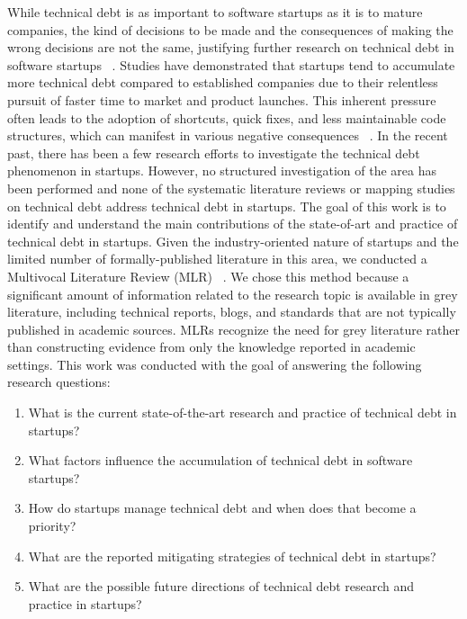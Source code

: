 While technical debt is as important to software startups as it is to mature companies, the kind of decisions to be made and the consequences of making the wrong decisions are not the same, justifying further research on technical debt in software startups ~\cite{Unterkalmsteiner16}.
Studies have demonstrated that startups tend to accumulate more technical debt compared to established companies due to their relentless pursuit of faster time to market and product launches.
This inherent pressure often leads to the adoption of shortcuts, quick fixes, and less maintainable code structures, which can manifest in various negative consequences ~\cite{Giardino2016,Klotins882019}.
In the recent past, there has been a few research efforts to investigate the technical debt phenomenon in startups.
However, no structured investigation of the area has been performed and none of the systematic literature reviews or mapping studies on technical debt address technical debt in startups.
The goal of this work is to identify and understand the main contributions of the state-of-art and practice of technical debt in startups.
Given the industry-oriented nature of startups and the limited number of formally-published literature in this area, we conducted a Multivocal Literature Review (MLR) ~\cite{GAROUSI2019101}.
We chose this method because a significant amount of information related to the research topic is available in grey literature, including technical reports, blogs, and standards that are not typically published in academic sources.
MLRs recognize the need for grey literature rather than constructing evidence from only the knowledge reported in academic settings.
This work was conducted with the goal of answering the following research questions:
\begin{enumerate}
\item What is the current state-of-the-art research and practice of technical debt in startups?
\item {What factors influence the accumulation of technical debt in software startups?}
\item {How do startups manage technical debt and when does that become a priority?}
\item What are the reported mitigating strategies of technical debt in startups?
\item What are the possible future directions of technical debt research and practice in startups?
\end{enumerate}

